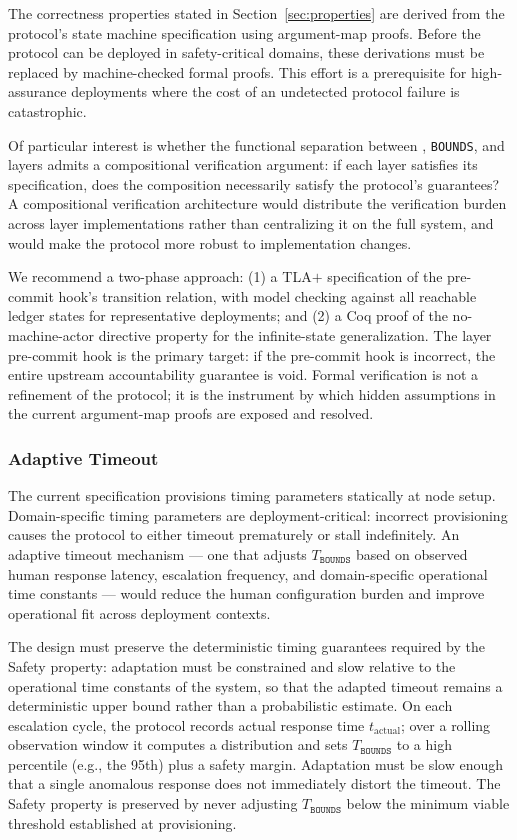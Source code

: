 The correctness properties stated in Section~\ref{sec:properties} are derived from the protocol's state machine specification using argument-map proofs. Before the protocol can be deployed in safety-critical domains, these derivations must be replaced by machine-checked formal proofs. This effort is a prerequisite for high-assurance deployments where the cost of an undetected protocol failure is catastrophic.

Of particular interest is whether the functional separation between \purpose{}, \texttt{BOUNDS}{}, and \fact{} layers admits a compositional verification argument: if each layer satisfies its specification, does the composition necessarily satisfy the protocol's guarantees? A compositional verification architecture would distribute the verification burden across layer implementations rather than centralizing it on the full system, and would make the protocol more robust to implementation changes.

We recommend a two-phase approach: (1) a TLA$+$ specification of the pre-commit hook's transition relation, with model checking against all reachable ledger states for representative deployments; and (2) a Coq proof of the no-machine-actor directive property for the infinite-state generalization. The \fact{} layer pre-commit hook is the primary target: if the pre-commit hook is incorrect, the entire upstream accountability guarantee is void. Formal verification is not a refinement of the protocol; it is the instrument by which hidden assumptions in the current argument-map proofs are exposed and resolved.

\subsubsection{Adaptive Timeout}
\label{sec:adaptive-timeout}

The current specification provisions timing parameters statically at node setup. Domain-specific timing parameters are deployment-critical: incorrect provisioning causes the protocol to either timeout prematurely or stall indefinitely. An adaptive timeout mechanism --- one that adjusts $T_{\texttt{BOUNDS}}$ based on observed human response latency, escalation frequency, and domain-specific operational time constants --- would reduce the human configuration burden and improve operational fit across deployment contexts.

The design must preserve the deterministic timing guarantees required by the Safety property: adaptation must be constrained and slow relative to the operational time constants of the system, so that the adapted timeout remains a deterministic upper bound rather than a probabilistic estimate. On each escalation cycle, the protocol records actual response time $t_{\mathrm{actual}}$; over a rolling observation window it computes a distribution and sets $T_{\texttt{BOUNDS}}$ to a high percentile (e.g., the 95th) plus a safety margin. Adaptation must be slow enough that a single anomalous response does not immediately distort the timeout. The Safety property is preserved by never adjusting $T_{\texttt{BOUNDS}}$ below the minimum viable threshold established at provisioning.

